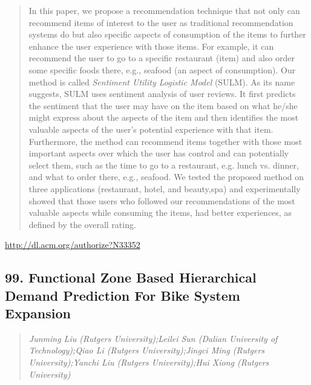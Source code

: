 \documentclass{article}
\begin{document}
\begin{quote}
In this paper, we propose a recommendation technique that not only can recommend items of interest to the user as traditional recommendation systems do but also specific aspects of consumption of the items to further enhance the user experience with those items. For example, it can recommend the user to go to a specific restaurant (item) and also order some specific foods there, e.g., seafood (an aspect of consumption). Our method is called {\em Sentiment Utility Logistic Model} (SULM). As its name suggests, SULM uses sentiment analysis of user reviews. It first predicts the sentiment that the user may have on the item based on what he/she might express about the aspects of the item and then identifies the most valuable aspects of the user’s potential experience with that item. Furthermore, the method can recommend items together with those most important aspects over which the user has control and can potentially select them, such as the time to go to a restaurant, e.g. lunch vs. dinner, and what to order there, e.g., seafood. We tested the proposed method on three applications (restaurant, hotel, and beauty,spa) and experimentally showed that those users who followed our recommendations of the most valuable aspects while consuming the items, had better experiences, as defined by the overall rating.
\end{quote}

\href{http://dl.acm.org/authorize?N33352}{http://dl.acm.org/authorize?N33352}

\subsection{99. Functional Zone Based Hierarchical Demand Prediction For Bike System Expansion}

\begin{quote}
\footnotesize{\textit{Junming Liu (Rutgers University);Leilei Sun (Dalian University of Technology);Qiao Li (Rutgers University);Jingci Ming (Rutgers University);Yanchi Liu (Rutgers University);Hui Xiong (Rutgers University)}}

\end{quote}
\end{document}
